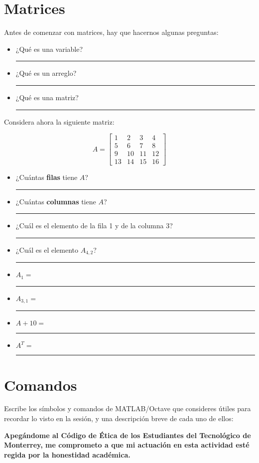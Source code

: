 \documentclass[spanish, 10pt]{article}
\newcommand{\shortresponserule}{{\large\rule{5 cm}{0.3mm}}}
\begin{document}
\section{Matrices}

Antes de comenzar con matrices, hay que hacernos algunas preguntas:

\begin{itemize}
    \item ¿Qué es una variable? \hfill \shortresponserule
    \item ¿Qué es un arreglo? \hfill \shortresponserule
	\item ¿Qué es una matriz? \hfill \shortresponserule
\end{itemize}

Considera ahora la siguiente matriz:

$$A = \begin{bmatrix}
    1 & 2 & 3 & 4\\
    5 & 6 & 7 & 8\\
    9 & 10 & 11 & 12\\
    13 & 14 & 15& 16
\end{bmatrix}$$

\begin{itemize}
    \item ¿Cuántas \textbf{filas} tiene $A$? \hfill \shortresponserule
    \item ¿Cuántas \textbf{columnas} tiene $A$? \hfill \shortresponserule
    \item ¿Cuál es el elemento de la fila 1 y de la columna 3? \hfill \shortresponserule
    \item ¿Cuál es el elemento $A_{4,2}$? \hfill \shortresponserule
\end{itemize}

\begin{itemize}
    \item $A_{1} =$ \hfill \shortresponserule
    \item $A_{3,1} =$ \hfill \shortresponserule
    \item $A + 10 =$ \hfill \shortresponserule
    \item $A^T =$ \hfill \shortresponserule
\end{itemize}

\section{Comandos}

Escribe los símbolos y comandos de MATLAB/Octave que consideres útiles para recordar lo visto en la sesión, y una descripción breve de cada uno de ellos:

\vfill

\textbf{Apegándome al Código de Ética de los Estudiantes del Tecnológico de Monterrey, me comprometo a que mi actuación en esta actividad esté regida por la honestidad académica.}
\end{document}
